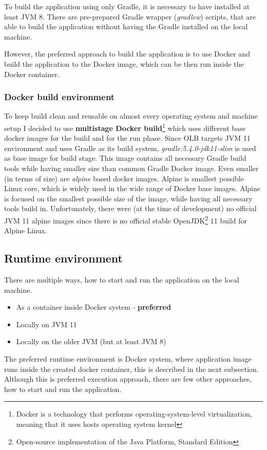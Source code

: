 To build the application using only Gradle,
it is necessary to have installed at least JVM 8.
There are pre-prepared Gradle wrapper (\textit{gradlew}) scripts,
that are able to build the application without having the Gradle installed on the local machine.

However, the preferred approach to build the application is to use Docker
and build the application to the Docker image, 
which can be then run inside the Docker container.

\subsubsection{Docker build environment}
To keep build clean and reusable on almost every operating system and 
machine setup I decided to use 
\textbf{multistage Docker build}\footnote{Docker is a technology that performs operating-system-level virtualization,
meaning that it uses hosts operating system kernel}
which uses different base docker images for the build and for the run phase.
Since OLB targets JVM 11 environment and uses Gradle as its build system,
\textit{gradle:5.4.0-jdk11-slim} is used as base image for build stage.
This image contains all necessary Gradle build tools while having smaller size than common Gradle Docker image.
Even smaller (in terms of size) are \textit{alpine} based docker images. 
Alpine is smallest possible Linux core, 
which is widely used in the wide range of Docker base images.
Alpine is focused on the smallest possible size of the image, 
while having all necessary tools build in.
Unfortunately, there were (at the time of development) no official JVM 11 alpine images
since there is no official stable OpenJDK\footnote{Open-source implementation of the Java Platform, Standard Edition} 
11 build for Alpine Linux.

\subsection{Runtime environment}
There are multiple ways, how to start and run the application on the local machine.
\begin{itemize}
	\item As a container inside Docker system - \textbf{preferred}
	\item Locally on JVM 11
	\item Locally on the older JVM (but at least JVM 8)
\end{itemize}

The preferred runtime environment is Docker system, 
where application image runs inside the created docker container,
this is described in the next subsection.
Although this is preferred execution approach,
there are few other approaches,
how to start and run the application.

